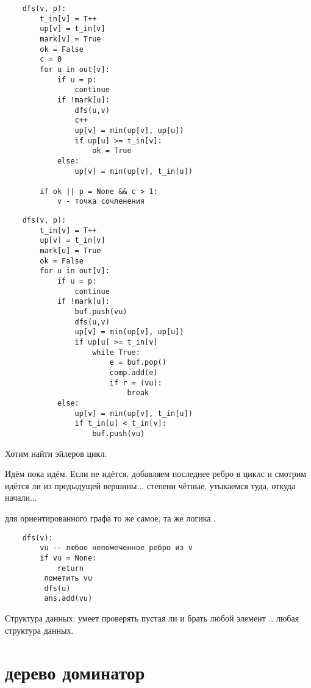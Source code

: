 \documentclass{book}
\theoremstyle{definition}
\begin{document}
\begin{lstlisting}
    dfs(v, p):
        t_in[v] = T++
        up[v] = t_in[v]
        mark[v] = True
        ok = False
        c = 0
        for u in out[v]:
            if u = p:
                continue
            if !mark[u]:
                dfs(u,v)
                c++
                up[v] = min(up[v], up[u])
                if up[u] >= t_in[v]:
                    ok = True
            else:
                up[v] = min(up[v], t_in[u])

        if ok || p = None && c > 1:
            v - точка сочленения
\end{lstlisting}

\begin{lstlisting}
    dfs(v, p):
        t_in[v] = T++
        up[v] = t_in[v]
        mark[u] = True
        ok = False
        for u in out[v]:
            if u = p:
                continue
            if !mark[u]:
                buf.push(vu)
                dfs(u,v)
                up[v] = min(up[v], up[u])
                if up[u] >= t_in[v]
                    while True:
                        e = buf.pop()
                        comp.add(e)
                        if r = (vu):
                            break
            else:
                up[v] = min(up[v], t_in[u])
                if t_in[u] < t_in[v]:
                    buf.push(vu)
\end{lstlisting}

\begin{problem}
    Хотим найти эйлеров цикл.

    Идём пока идём. Если не идётся, добавляем последнее ребро в циклс и смотрим идётся ли из предыдущей вершины... степени чётные, утыкаемся туда, откуда начали...

    для ориентированного графа то же самое, та же логика..
\end{problem} 

\begin{lstlisting}
    dfs(v):
        vu -- любое непомеченное ребро из v
        if vu = None:
            return
         пометить vu
         dfs(u)
         ans.add(vu)
\end{lstlisting}

Структура данных: умеет проверять пустая ли и брать любой элемент .. любая структура данных.

\section{дерево доминатор}
\end{document}
